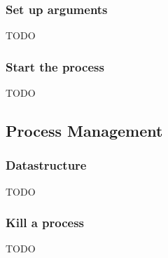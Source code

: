 \subsubsection{Set up arguments}
TODO

\subsubsection{Start the process}
TODO

\subsection{Process Management}

\subsubsection{Datastructure}
TODO

\subsubsection{Kill a process}
TODO


